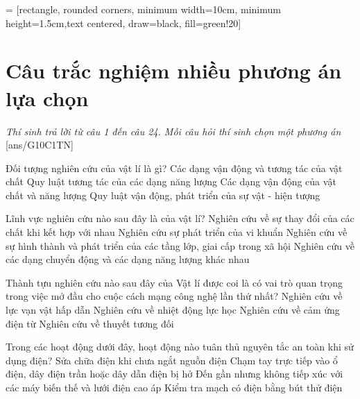  = [rectangle, rounded corners, minimum width=10cm, minimum height=1.5cm,text centered, draw=black, fill=green!20]
\begin{center}
\end{center}
\section{Câu trắc nghiệm nhiều phương án lựa chọn}
\textit{Thí sinh trả lời từ câu 1 đến câu 24. Mỗi câu hỏi thí sinh chọn một phương án}
\setcounter{ex}{0}
[ans/G10C1TN]
\begin{ex}
	Đối tượng nghiên cứu của vật lí là gì?
	\choice
	{Các dạng vận động và tương tác của vật chất}
	{Quy luật tương tác của các dạng năng lượng}
	{\True Các dạng vận động của vật chất và năng lượng}
	{Quy luật vận động, phát triển của sự vật - hiện tượng}
	\loigiai{}
\end{ex}
\begin{ex}
Lĩnh vực nghiên cứu nào sau đây là của vật lí?	
	\choice
	{Nghiên cứu về sự thay đổi của các chất khi kết hợp với nhau}
	{Nghiên cứu sự phát triển của vi khuẩn}
	{Nghiên cứu về sự hình thành và phát triển của các tầng lớp, giai cấp trong xã hội}
	{\True Nghiên cứu về các dạng chuyển động và các dạng năng lượng khác nhau}
	\loigiai{}
\end{ex}
\begin{ex}
	Thành tựu nghiên cứu nào sau đây của Vật lí được coi là có vai trò quan trọng trong việc mở đầu cho cuộc cách mạng công nghệ lần thứ nhất?
	\choice
	{Nghiên cứu về lực vạn vật hấp dẫn}
	{\True Nghiên cứu về nhiệt động lực học}
	{Nghiên cứu về cảm ứng điện từ}
	{Nghiên cứu về thuyết tương đối}
	\loigiai{}
\end{ex}
\begin{ex}
	Trong các hoạt động dưới đây, hoạt động nào tuân thủ nguyên tắc an toàn khi sử dụng điện?
	\choice
	{Sửa chữa điện khi chưa ngắt nguồn điện}
	{Chạm tay trực tiếp vào ổ điện, dây điện trần hoặc dây dẫn điện bị hở}
	{Đến gần nhưng không tiếp xúc với các máy biến thế và lưới điện cao áp}
	{\True Kiểm tra mạch có điện bằng bút thử điện}
	\loigiai{}
\end{ex}
